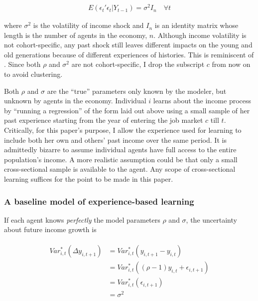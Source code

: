 \documentclass[12pt,notitlepage,onecolumn,aps,pra]{article}
\begin{document}
\begin{eqnarray}
E(\epsilon_{t}'\epsilon_{t}|Y_{t-1}) = \sigma^2 I_n \quad \forall t 
\end{eqnarray}

where \(\sigma^2\) is the volatility of income shock and \(I_n\) is an
identity matrix whose length is the number of agents in the economy,
\(n\). Although income volatility is not cohort-specific, any past shock
still leaves different impacts on the young and old generations because
of different experiences of histories. This is reminiscent of
\cite{bansal2004risks}. Since both \(\rho\) and \(\sigma^2\) are not
cohort-specific, I drop the subscript \(c\) from now on to avoid
clustering.

Both \(\rho\) and \(\sigma\) are the ``true'' parameters only known by
the modeler, but unknown by agents in the economy. Individual \(i\)
learns about the income process by ``running a regression'' of the form
laid out above using a small sample of her past experience starting from
the year of entering the job market \(c\) till \(t\). Critically, for
this paper's purpose, I allow the experience used for learning to
include both her own and others' past income over the same period. It is
admittedly bizarre to assume individual agents have full access to the
entire population's income. A more realistic assumption could be that
only a small cross-sectional sample is available to the agent. Any scope
of cross-sectional learning suffices for the point to be made in this
paper.

    \hypertarget{a-baseline-model-of-experience-based-learning}{%
\subsubsection{A baseline model of experience-based
learning}\label{a-baseline-model-of-experience-based-learning}}

If each agent knows \emph{perfectly} the model parameters \(\rho\) and
\(\sigma\), the uncertainty about future income growth is

\begin{eqnarray}
\begin{split}
Var^*_{i,t}(\Delta y_{i,t+1}) & =  Var^*_{i,t}(y_{i,t+1}- y_{i,t}) \\ 
& =  Var^*_{i,t}((\rho-1)y_{i,t} + \epsilon_{i,t+1}) \\
& = Var^*_{i,t}(\epsilon_{i,t+1}) \\
& = \sigma^2
\end{split}
\end{eqnarray}
\end{document}
